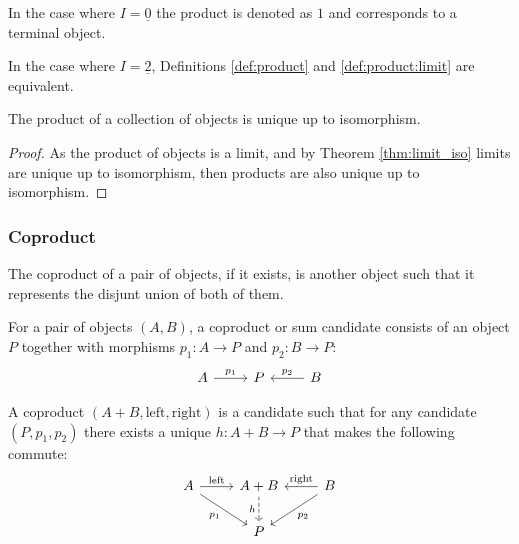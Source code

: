 \begin{remark}
	In the case where $I=\underline{0}$ the product is denoted as $1$ and
	corresponds to a terminal object.
\end{remark}

\begin{remark}
	In the case where $I=\underline{2}$, Definitions \ref{def:product} and
	\ref{def:product:limit} are equivalent.
\end{remark}

\begin{theorem}
	The product of a collection of objects is unique up to isomorphism.

	\begin{proof}
		As the product of objects is a limit, and by Theorem \ref{thm:limit_iso}
		limits are unique up to isomorphism, then products are also unique up to
		isomorphism.
	\end{proof}
\end{theorem}

\subsubsection*{Coproduct}
The coproduct of a pair of objects, if it exists, is another object such that it
represents the disjunt union of both of them.

\begin{definition}

	For a pair of objects $(A, B)$, a coproduct or sum candidate consists of an
	object $P$ together with morphisms $p_1: A\to P$ and
	$p_2:B\to P$:
	\[\begin{tikzcd}[ampersand replacement=\&]
		A \& P \& B
		\arrow["{p_1}", from=1-1, to=1-2]
		\arrow["{p_2}"', from=1-3, to=1-2]
	\end{tikzcd}\]

	A coproduct $(A+ B, \mathrm{left}, \mathrm{right})$ is a candidate such that
	for any candidate $(P, p_1, p_2)$ there exists a unique $h: A+B\to P$ that
	makes the following commute:
	\parencite{leinster:basic_category_theory}
	\[\begin{tikzcd}[ampersand replacement=\&]
		A \& {A+ B} \& B \\
		\& P
		\arrow["{\mathrm{left}}", from=1-1, to=1-2]
		\arrow["{\mathrm{right}}"', from=1-3, to=1-2]
		\arrow["{p_1}"', from=1-1, to=2-2]
		\arrow["{p_2}", from=1-3, to=2-2]
		\arrow["h"', dashed, from=1-2, to=2-2]
	\end{tikzcd}\]
\end{definition}

